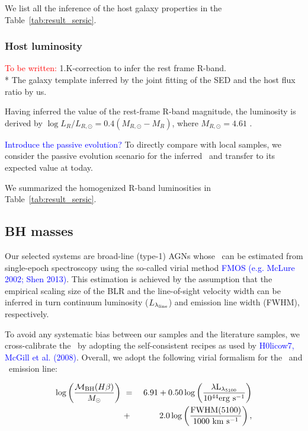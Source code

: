 \documentclass[apj]{emulateapj}
\begin{document}
We list all the inference of the host galaxy properties in the Table~\ref{tab:result_sersic}.


\subsubsection{Host luminosity}
\textcolor{red}{To be written:}
1.K-correction to infer the rest frame R-band.\\
* The galaxy template inferred by the joint fitting of the SED and the host flux ratio by us.

Having inferred the value of the rest-frame R-band magnitude, the luminosity is derived by $\log L_R/L_{R, \odot} = 0.4 (M_{R, \odot}-M_R)$, where $M_{R, \odot}=4.61$ \citep{Blanton07}.

\textcolor{blue}{Introduce the passive evolution?}
To directly compare with local samples, we consider the passive evolution scenario for the inferred \lhost\ and transfer to its expected value at today.

We summarized the homogenized R-band luminosities
in Table~\ref{tab:result_sersic}.

\subsection{BH masses}
\label{mbh}
Our selected systems are broad-line (type-1) AGNs whose \mbh\ can be estimated from single-epoch spectroscopy using the so-called virial method \textcolor{blue}{FMOS (e.g. McLure 2002; Shen 2013)}. This estimation is achieved by the assumption that the empirical scaling size of the BLR and the line-of-sight velocity width can be inferred in turn continuum luminosity ($L _{\lambda_{\rm line}}$) and emission line width (FWHM), respectively.

To avoid any systematic bias between our samples and the literature samples, we cross-calibrate the \mbh\ by adopting the self-consistent recipes as used by \textcolor{blue}{H0licow7, McGill et al. (2008)}. Overall, we adopt the following virial formalism for the \halpha\ and \hbeta\ emission line:

\begin{eqnarray}
\label{eq:Hb}
\log \left(\frac{\mathcal M_{\rm BH}(H\beta) }{M_{\odot}}\right)&~=~& 6.91+0.50\log \left(\frac{ \lambda \rm L _{\lambda_{5100}}}{10^{44}{\rm erg~s^{-1}}}\right) \nonumber\\
&~+~& 2.0 \log \left(\frac{\rm FWHM(5100)}{1000 ~{\rm km~s^{-1}}}\right) , 
\end {eqnarray}
\end{document}
